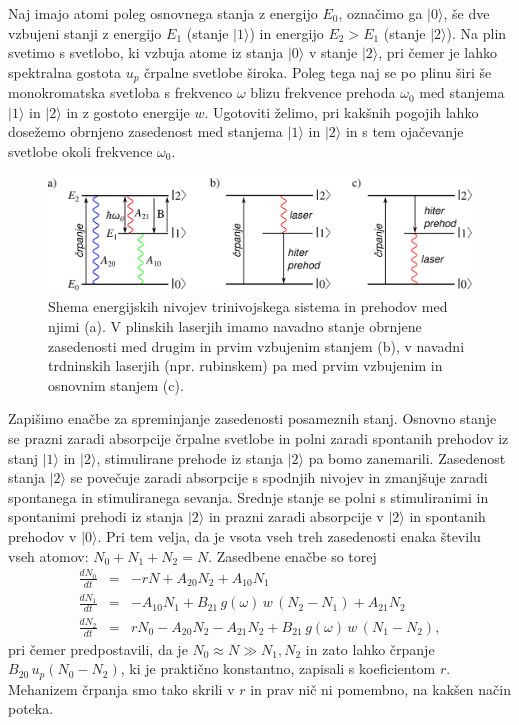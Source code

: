 Naj imajo atomi poleg osnovnega stanja z energijo $E_0$, označimo ga $|0\rangle$,
še dve vzbujeni stanji z energijo $E_1$ (stanje $|1\rangle$) in energijo $E_2>E_1$
(stanje $|2\rangle$). Na plin svetimo s svetlobo, ki
vzbuja atome iz stanja $|0\rangle$ v stanje $|2\rangle$, pri čemer
je lahko spektralna gostota $u_{p}$ črpalne svetlobe široka. Poleg
tega naj se po plinu širi še monokromatska svetloba s frekvenco $\omega$
blizu frekvence prehoda $\omega_{0}$ med stanjema $|1\rangle$ in
$|2\rangle$ in z gostoto energije $w$. Ugotoviti želimo, pri kakšnih
pogojih lahko dosežemo obrnjeno zasedenost med stanjema $|1\rangle$ in $|2\rangle$
in s tem ojačevanje svetlobe okoli frekvence $\omega_{0}$.
\begin{figure}[h]
\centering
\includegraphics[width=14truecm]{slike/05_Trinivojski.png}
\caption{Shema energijskih nivojev trinivojskega sistema in prehodov med njimi (a).
V plinskih laserjih imamo navadno stanje obrnjene zasedenosti med drugim in prvim
vzbujenim stanjem (b), v navadni trdninskih laserjih (npr. rubinskem) pa med 
prvim vzbujenim in osnovnim stanjem (c).}
\label{fig:3nivojski}
\end{figure}

\noindent
Zapišimo enačbe za spreminjanje zasedenosti posameznih stanj. Osnovno stanje
se prazni zaradi absorpcije črpalne svetlobe in polni zaradi
spontanih prehodov iz stanj $|1\rangle$ in $|2\rangle$, stimulirane
prehode iz stanja $|2\rangle$ pa bomo zanemarili. Zasedenost stanja $|2\rangle$ se
povečuje zaradi absorpcije s spodnjih nivojev in zmanjšuje
zaradi spontanega in stimuliranega sevanja. Srednje stanje se polni
s stimuliranimi in spontanimi prehodi iz stanja $|2\rangle$ in prazni
zaradi absorpcije v $|2\rangle$ in spontanih prehodov v $|0\rangle$.
Pri tem velja, da je vsota vseh treh zasedenosti enaka številu vseh atomov: $N_{0}+N_{1}+N_{2}=N$. 
Zasedbene enačbe so torej 
\begin{eqnarray}
\frac{dN_{0}}{dt} & = & -rN+A_{20}N_{2}+A_{10}N_{1} \label{4.39.1}\\
\frac{dN_{1}}{dt} & = & -A_{10}N_{1}+B_{21}\,g(\omega)\,w\, (N_{2}-N_{1})+A_{21}N_{2} \label{4.39.2}\\
\frac{dN_{2}}{dt} & = & rN_0-A_{20}N_{2}-A_{21}N_{2}+B_{21}\,g(\omega)\,w\, (N_1-N_2),
\label{4.39}
\end{eqnarray}
pri čemer predpostavili, da je $N_0 \approx N \gg N_1, N_2$ in zato lahko črpanje $B_{20}\, 
u_{p} (N_0-N_2)$, ki je praktično konstantno, zapisali s koeficientom $r$. Mehanizem črpanja 
smo tako skrili v $r$ in prav nič ni pomembno, na kakšen način poteka. \\

